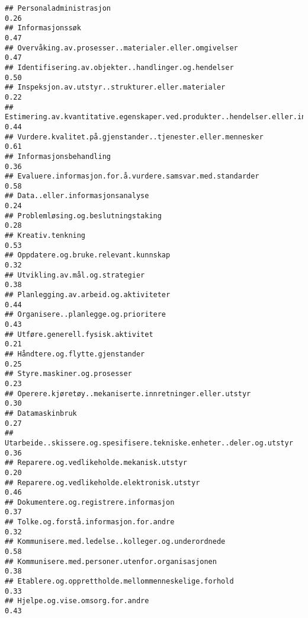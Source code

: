 \documentclass[
]{article}
\begin{document}
\begin{verbatim}
## Personaladministrasjon                                                           0.26
## Informasjonssøk                                                                  0.47
## Overvåking.av.prosesser..materialer.eller.omgivelser                             0.47
## Identifisering.av.objekter..handlinger.og.hendelser                              0.50
## Inspeksjon.av.utstyr..strukturer.eller.materialer                                0.22
## Estimering.av.kvantitative.egenskaper.ved.produkter..hendelser.eller.informasjon 0.44
## Vurdere.kvalitet.på.gjenstander..tjenester.eller.mennesker                       0.61
## Informasjonsbehandling                                                           0.36
## Evaluere.informasjon.for.å.vurdere.samsvar.med.standarder                        0.58
## Data..eller.informasjonsanalyse                                                  0.24
## Problemløsing.og.beslutningstaking                                               0.28
## Kreativ.tenkning                                                                 0.53
## Oppdatere.og.bruke.relevant.kunnskap                                             0.32
## Utvikling.av.mål.og.strategier                                                   0.38
## Planlegging.av.arbeid.og.aktiviteter                                             0.44
## Organisere..planlegge.og.prioritere                                              0.43
## Utføre.generell.fysisk.aktivitet                                                 0.21
## Håndtere.og.flytte.gjenstander                                                   0.25
## Styre.maskiner.og.prosesser                                                      0.23
## Operere.kjøretøy..mekaniserte.innretninger.eller.utstyr                          0.30
## Datamaskinbruk                                                                   0.27
## Utarbeide..skissere.og.spesifisere.tekniske.enheter..deler.og.utstyr             0.36
## Reparere.og.vedlikeholde.mekanisk.utstyr                                         0.20
## Reparere.og.vedlikeholde.elektronisk.utstyr                                      0.46
## Dokumentere.og.registrere.informasjon                                            0.37
## Tolke.og.forstå.informasjon.for.andre                                            0.32
## Kommunisere.med.ledelse..kolleger.og.underordnede                                0.58
## Kommunisere.med.personer.utenfor.organisasjonen                                  0.38
## Etablere.og.opprettholde.mellommenneskelige.forhold                              0.33
## Hjelpe.og.vise.omsorg.for.andre                                                  0.43

\end{verbatim}
\end{document}
